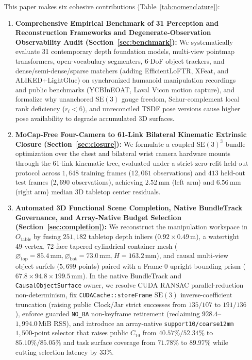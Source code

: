 \documentclass[10pt,journal]{IEEEtran}
\begin{document}
This paper makes six cohesive contributions (Table~\ref{tab:nomenclature}):
\begin{enumerate}
    \item \textbf{Comprehensive Empirical Benchmark of 31 Perception and Reconstruction Frameworks and Degenerate-Observation Observability Audit (Section~\ref{sec:benchmark}):} We systematically evaluate 31 contemporary depth foundation models, multi-view pointmap transformers, open-vocabulary segmenters, 6-DoF object trackers, and dense/semi-dense/sparse matchers (adding EfficientLoFTR, XFeat, and ALIKED+LightGlue) on synchronized humanoid manipulation recordings and public benchmarks (YCBInEOAT, Laval Vicon motion capture), and formalize why unanchored $\mathrm{SE}(3)$ gauge freedom, Schur-complement local rank deficiency ($r_i < 6$), and unreconciled TSDF pose versions cause higher pose availability to degrade accumulated 3D surfaces.
    \item \textbf{MoCap-Free Four-Camera to 61-Link Bilateral Kinematic Extrinsic Closure (Section~\ref{sec:closure}):} We formulate a coupled $\mathrm{SE}(3)^3$ bundle optimization over the chest and bilateral wrist camera hardware mounts through the 61-link kinematic tree, evaluated under a strict zero-refit held-out protocol across $1{,}648$ training frames ($12{,}061$ observations) and $413$ held-out test frames ($2{,}690$ observations), achieving $2.52\,\mathrm{mm}$ (left arm) and $6.56\,\mathrm{mm}$ (right arm) median 3D tabletop center residuals.
    \item \textbf{Automated 3D Functional Scene Completion, Native BundleTrack Governance, and Array-Native Budget Selection (Section~\ref{sec:completion}):} We reconstruct the manipulation workspace in $O_{\mathrm{table}}$ by fusing $251{,}182$ tabletop depth inliers ($0.92\times 0.49\,\mathrm{m}$), a watertight 49-vertex, 72-face tapered cylindrical container mesh ($\varnothing_{\mathrm{top}}=85.4\,\mathrm{mm}, \varnothing_{\mathrm{bot}}=73.0\,\mathrm{mm}, H=163.2\,\mathrm{mm}$), and causal multi-view object surfels ($5{,}699$ points) paired with a Frame-0 upright bounding prism ($67.8\times 94.8\times 199.5\,\mathrm{mm}$). In the native BundleTrack and \texttt{CausalObjectSurface} owner, we resolve CUDA RANSAC parallel-reduction non-determinism, fix \texttt{CUDACache::storeFrame} $\mathrm{SE}(3)$ inverse-coefficient truncation (raising public Clock/Jar strict successes from $135/107$ to $191/136$), enforce guarded \texttt{NO\_BA} non-keyframe retirement (reclaiming $928.4$--$1{,}994.0\,\mathrm{MiB}$ RSS), and introduce an array-native \texttt{support10/coarse12mm} $1{,}500$-point selector that raises public $C_{10}$ from $40.57\%/52.34\%$ to $85.10\%/85.05\%$ and task surface coverage from $71.78\%$ to $89.97\%$ while cutting selection latency by $33\%$.

\end{enumerate}
\end{document}
